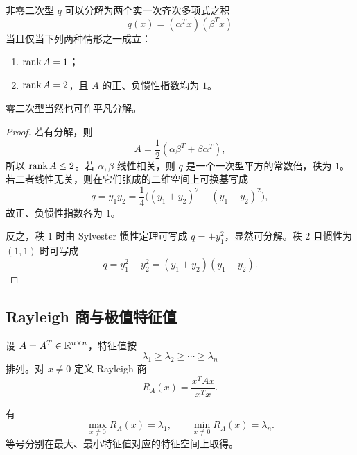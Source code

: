 \begin{theorem}
非零二次型 $q$ 可以分解为两个实一次齐次多项式之积
\begin{equation}
 q(x)=(\alpha^Tx)(\beta^Tx)
\end{equation}
当且仅当下列两种情形之一成立：
\begin{enumerate}
  \item $\operatorname{rank} A=1$；
  \item $\operatorname{rank} A=2$，且 $A$ 的正、负惯性指数均为 $1$。
\end{enumerate}
零二次型当然也可作平凡分解。
\end{theorem}

\begin{proof}
若有分解，则
\begin{equation}
 A=\frac12(\alpha\beta^T+\beta\alpha^T),
\end{equation}
所以 $\operatorname{rank} A\leq2$。若 $\alpha,\beta$ 线性相关，则 $q$ 是一个一次型平方的常数倍，秩为 $1$。若二者线性无关，则在它们张成的二维空间上可换基写成
\begin{equation}
 q=y_1y_2
 =\frac14\bigl((y_1+y_2)^2-(y_1-y_2)^2\bigr),
\end{equation}
故正、负惯性指数各为 $1$。

反之，秩 $1$ 时由 Sylvester 惯性定理可写成 $q=\pm y_1^2$，显然可分解。秩 $2$ 且惯性为 $(1,1)$ 时可写成
\begin{equation}
 q=y_1^2-y_2^2=(y_1+y_2)(y_1-y_2).
\end{equation}
\end{proof}

\subsection{Rayleigh 商与极值特征值}

设 $A=A^T\in\mathbb R^{n\times n}$，特征值按
\begin{equation}
 \lambda_1\geq\lambda_2\geq\cdots\geq\lambda_n
\end{equation}
排列。对 $x\neq0$ 定义 Rayleigh 商
\begin{equation}
 R_A(x)=\frac{x^TAx}{x^Tx}.
\end{equation}

\begin{theorem}
有
\begin{equation}
 \max_{x\neq0}R_A(x)=\lambda_1,
 \qquad
 \min_{x\neq0}R_A(x)=\lambda_n.
\end{equation}
等号分别在最大、最小特征值对应的特征空间上取得。
\end{theorem}

